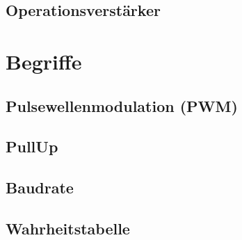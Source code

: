\subsection{Operationsverstärker}
\label{subsec:operationsverstaerker}

\section{Begriffe}
\label{sec:begriffe}

\subsection{Pulsewellenmodulation (PWM)}
\label{subsec:pulsewellenmodulation-(pwm)}

\subsection{PullUp}
\label{subsec:pullup}

\subsection{Baudrate}
\label{subsec:baudrate}

\subsection{Wahrheitstabelle}
\label{subsec:wahrheitstabelle}
